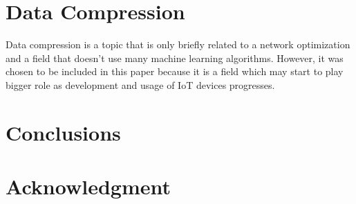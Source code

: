 \documentclass[conference]{IEEEtran}
\begin{document}
\section{Data Compression}
Data compression is a topic that is only briefly related to a network optimization and a field that doesn't use many machine learning algorithms. However, it was chosen to be included in this paper because it is a field which may start to play bigger role as development and usage of IoT devices progresses.\par


\section{Conclusions}



\section*{Acknowledgment}




\end{document}
